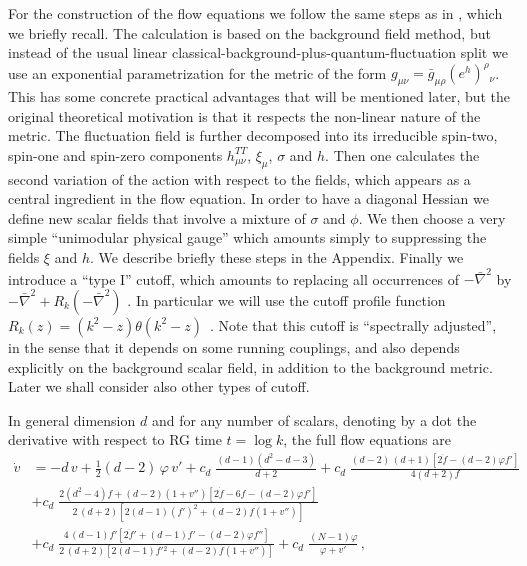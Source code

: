 \documentclass[11pt]{book} %
\newcommand{\bnabla}{\bar\nabla}
\begin{document}
For the construction of the flow equations we follow the same steps
as in \cite{Percacci:2015wwa}, which we briefly recall.
The calculation is based on the background field method,
but instead of the usual linear classical-background-plus-quantum-fluctuation split we
use an exponential parametrization
for the metric of the form
$g_{\mu\nu}=\bar g_{\mu\rho}(e^h)^\rho{}_\nu$.
This has some concrete practical advantages that will be
mentioned later,
but the original theoretical motivation is that it
respects the non-linear nature of the metric.
The fluctuation field is further decomposed into its irreducible
spin-two, spin-one and spin-zero components $h_{\mu\nu}^{TT}$,
$\xi_\mu$, $\sigma$ and $h$.
Then one calculates the second variation of the action with
respect to the fields, which appears as a central ingredient
in the flow equation.
In order to have a diagonal Hessian we define new scalar fields
that involve a mixture of $\sigma$ and $\phi$.
We then choose a very simple ``unimodular physical gauge''
which amounts simply to suppressing the fields $\xi$ and $h$.
We describe briefly these steps in the Appendix.
Finally we introduce a ``type I'' cutoff, which amounts to replacing
all occurrences of $-\bnabla^2$ by $-\bnabla^2+R_k(-\bnabla^2)$
\cite{Codello:2008vh}.
In particular we will use the cutoff profile function
$R_k(z)=\left(k^2-z\right)\theta\left(k^2-z\right)$~\cite{Litim:2001up}.
Note that this cutoff is ``spectrally adjusted'',
in the sense that it depends on some running couplings,
and also depends explicitly on the background scalar field,
in addition to the background metric.
Later we shall consider also other types of cutoff.

In general dimension $d$ and for any number of scalars,
denoting by a dot the derivative with respect to RG time $t=\log k$,
the full flow equations are
\begin{align}
  \dot v &= - d \, v + \frac{1}{2} (d-2) \, \varphi \, v'
    + c_d \; \frac{(d-1) \left( d^2 - d - 3 \right)} {d+2}
    + c_d \; \frac{ (d-2) \, (d+1) \left[ 2 \dot f - (d-2) \varphi f' \right] }{4 \left( d+2 \right) f} \nonumber \\[3mm]
  & + c_d \; \frac{ 2 \left( d^2 - 4 \right) f + (d - 2) \left( 1 + v'' \right) \left[ 2 \dot f - 6 f - (d - 2) \varphi f' \right] }
                  { 2 \, (d+2) \left[ 2 (d-1) \left( f' \right)^2 + (d-2) f \left( 1 + v'' \right) \right] } \nonumber \\[3mm]
  & + c_d \; \frac{ 4 \, (d - 1) f' \left[ 2 \dot f' + (d - 1) f' - (d - 2) \varphi f'' \right] }
                  { 2 \, (d+2) \left[ 2 (d-1) f'{}^2 + (d-2) f \left( 1 + v'' \right) \right] }
    + c_d \; \frac{(N-1)\varphi}{\varphi+v'} \,,
  \label{flowvfull}
\end{align}
\end{document}
